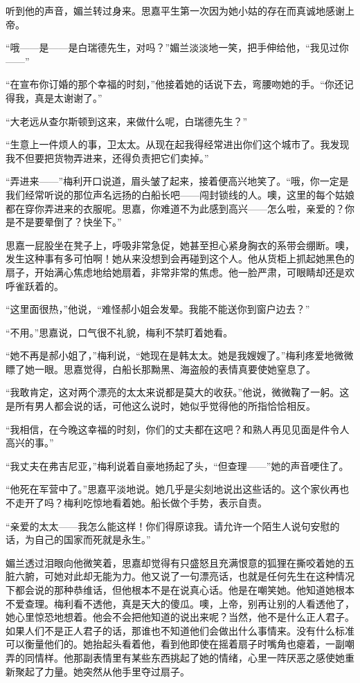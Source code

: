 \par 听到他的声音，媚兰转过身来。思嘉平生第一次因为她小姑的存在而真诚地感谢上帝。
\par “哦——是——是白瑞德先生，对吗？”媚兰淡淡地一笑，把手伸给他，“我见过你——”
\par “在宣布你订婚的那个幸福的时刻，”他接着她的话说下去，弯腰吻她的手。“你还记得我，真是太谢谢了。”
\par “大老远从查尔斯顿到这来，来做什么呢，白瑞德先生？”
\par “生意上一件烦人的事，卫太太。从现在起我得经常进出你们这个城市了。我发现我不但要把货物弄进来，还得负责把它们卖掉。”
\par “弄进来——”梅利开口说道，眉头皱了起来，接着便高兴地笑了。“哦，你一定是我们经常听说的那位声名远扬的白船长吧——闯封锁线的人。噢，这里的每个姑娘都在穿你弄进来的衣服呢。思嘉，你难道不为此感到高兴——怎么啦，亲爱的？你是不是要晕倒了？快坐下。”
\par 思嘉一屁股坐在凳子上，呼吸非常急促，她甚至担心紧身胸衣的系带会绷断。噢，发生这种事有多可怕啊！她从来没想到会再碰到这个人。他从货柜上抓起她黑色的扇子，开始满心焦虑地给她扇着，非常非常的焦虑。他一脸严肃，可眼睛却还是欢呼雀跃着的。
\par “这里面很热，”他说，“难怪郝小姐会发晕。我能不能送你到窗户边去？”
\par “不用。”思嘉说，口气很不礼貌，梅利不禁盯着她看。
\par “她不再是郝小姐了，”梅利说，“她现在是韩太太。她是我嫂嫂了。”梅利疼爱地微微瞟了她一眼。思嘉觉得，白船长那黝黑、海盗般的表情真要使她窒息了。
\par “我敢肯定，这对两个漂亮的太太来说都是莫大的收获。”他说，微微鞠了一躬。这是所有男人都会说的话，可他这么说时，她似乎觉得他的所指恰恰相反。
\par “我相信，在今晚这幸福的时刻，你们的丈夫都在这吧？和熟人再见见面是件令人高兴的事。”
\par “我丈夫在弗吉尼亚，”梅利说着自豪地扬起了头，“但查理——”她的声音哽住了。
\par “他死在军营中了。”思嘉平淡地说。她几乎是尖刻地说出这些话的。这个家伙再也不走开了吗？梅利吃惊地看着她。船长做个手势，表示自责。
\par “亲爱的太太——我怎么能这样！你们得原谅我。请允许一个陌生人说句安慰的话，为自己的国家而死就是永生。”
\par 媚兰透过泪眼向他微笑着，思嘉却觉得有只盛怒且充满恨意的狐狸在撕咬着她的五脏六腑，可她对此却无能为力。他又说了一句漂亮话，也就是任何先生在这种情况下都会说的那种恭维话，但他根本不是在说真心话。他是在嘲笑她。他知道她根本不爱查理。梅利看不透他，真是天大的傻瓜。噢，上帝，别再让别的人看透他了，她心里惊恐地想着。他会不会把他知道的说出来呢？当然，他不是什么正人君子。如果人们不是正人君子的话，那谁也不知道他们会做出什么事情来。没有什么标准可以衡量他们的。她抬起头看着他，看到他即使在摇着扇子时嘴角也瘪着，一副嘲弄的同情样。他那副表情里有某些东西挑起了她的情绪，心里一阵厌恶之感使她重新聚起了力量。她突然从他手里夺过扇子。
